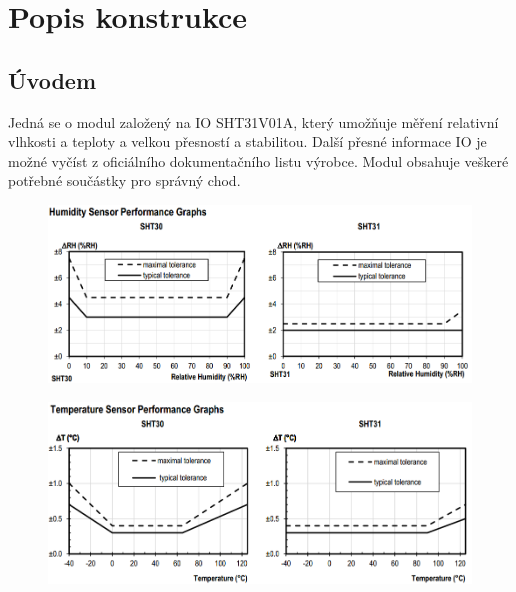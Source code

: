 \documentclass[12pt,a4paper]{article}
\begin{document}

\newpage

\section{Popis konstrukce}\label{popis-konstrukce}

\subsection{Úvodem}\label{uxfavodem}

Jedná se o modul založený na IO SHT31V01A, který umožňuje měření
relativní vlhkosti a teploty a velkou přesností a stabilitou. Další
přesné informace IO je možné vyčíst z oficiálního dokumentačního listu
výrobce. Modul obsahuje veškeré potřebné součástky pro správný chod.

\begin{figure}[htbp]
\centering
\includegraphics{DOC/SRC/img/docA.jpg}
\caption{}
\end{figure}

\begin{figure}[htbp]
\centering
\includegraphics{DOC/SRC/img/docB.jpg}
\caption{}
\end{figure}
\end{document}
